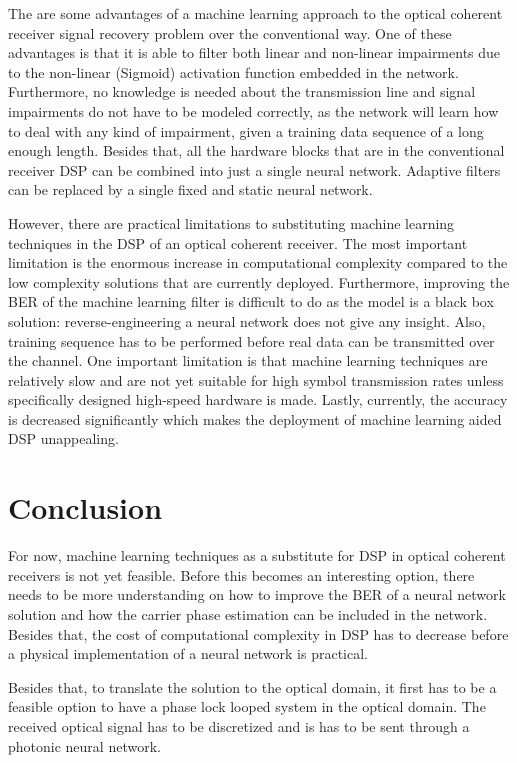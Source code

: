 \documentclass[journal,10pt,twoside, a4paper]{IEEEtran}
\begin{document}
The are some advantages of a machine learning approach to the optical coherent receiver signal recovery problem over the conventional way. One of these advantages is that it is able to filter both linear and non-linear impairments due to the non-linear (Sigmoid) activation function embedded in the network. Furthermore, no knowledge is needed about the transmission line and signal impairments do not have to be modeled correctly, as the network will learn how to deal with any kind of impairment, given a training data sequence of a long enough length. Besides that, all the hardware blocks that are in the conventional receiver DSP can be combined into just a single neural network. Adaptive filters can be replaced by a single fixed and static neural network.

However, there are practical limitations to substituting machine learning techniques in the DSP of an optical coherent receiver. The most important limitation is the enormous increase in computational complexity compared to the low complexity solutions that are currently deployed. Furthermore, improving the BER of the machine learning filter is difficult to do as the model is a black box solution: reverse-engineering a neural network does not give any insight. Also, training sequence has to be performed before real data can be transmitted over the channel. One important limitation is that machine learning techniques are relatively slow and are not yet suitable for high symbol transmission rates unless specifically designed high-speed hardware is made. Lastly, currently, the accuracy is decreased significantly which makes the deployment of machine learning aided DSP unappealing.

\section{Conclusion}
For now, machine learning techniques as a substitute for DSP in optical coherent receivers is not yet feasible. Before this becomes an interesting option, there needs to be more understanding on how to improve the BER of a neural network solution and how the carrier phase estimation can be included in the network. Besides that, the cost of computational complexity in DSP has to decrease before a physical implementation of a neural network is practical.

Besides that, to translate the solution to the optical domain, it first has to be a feasible option to have a phase lock looped system in the optical domain. The received optical signal has to be discretized and is has to be sent through a photonic neural network.

\balance



\end{document}
